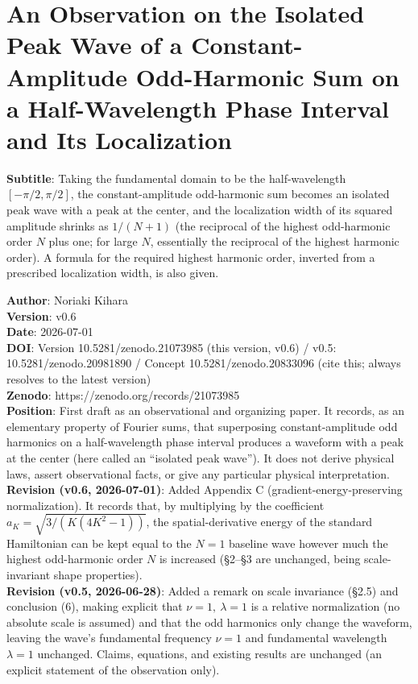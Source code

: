 \documentclass[
]{ltjsarticle}
\author{}
\date{}
\begin{document}
\section{An Observation on the Isolated Peak Wave of a
Constant-Amplitude Odd-Harmonic Sum on a Half-Wavelength Phase Interval
and Its
Localization}\label{an-observation-on-the-isolated-peak-wave-of-a-constant-amplitude-odd-harmonic-sum-on-a-half-wavelength-phase-interval-and-its-localization}

\textbf{Subtitle}: Taking the fundamental domain to be the
half-wavelength \([-\pi/2,\pi/2]\), the constant-amplitude odd-harmonic
sum becomes an isolated peak wave with a peak at the center, and the
localization width of its squared amplitude shrinks as \(1/(N+1)\) (the
reciprocal of the highest odd-harmonic order \(N\) plus one; for large
\(N\), essentially the reciprocal of the highest harmonic order). A
formula for the required highest harmonic order, inverted from a
prescribed localization width, is also given.

\textbf{Author}: Noriaki Kihara\\
\textbf{Version}: v0.6\\
\textbf{Date}: 2026-07-01\\
\textbf{DOI}: Version 10.5281/zenodo.21073985 (this version, v0.6) /
v0.5: 10.5281/zenodo.20981890 / Concept 10.5281/zenodo.20833096 (cite
this; always resolves to the latest version)\\
\textbf{Zenodo}: https://zenodo.org/records/21073985\\
\textbf{Position}: First draft as an observational and organizing paper.
It records, as an elementary property of Fourier sums, that superposing
constant-amplitude odd harmonics on a half-wavelength phase interval
produces a waveform with a peak at the center (here called an ``isolated
peak wave''). It does not derive physical laws, assert observational
facts, or give any particular physical interpretation.\\
\textbf{Revision (v0.6, 2026-07-01)}: Added Appendix C
(gradient-energy-preserving normalization). It records that, by
multiplying by the coefficient \(a_K=\sqrt{3/(K(4K^2-1))}\), the
spatial-derivative energy of the standard Hamiltonian can be kept equal
to the \(N=1\) baseline wave however much the highest odd-harmonic order
\(N\) is increased (§2--§3 are unchanged, being scale-invariant shape
properties).\\
\textbf{Revision (v0.5, 2026-06-28)}: Added a remark on scale invariance
(§2.5) and conclusion (6), making explicit that \(\nu=1,\ \lambda=1\) is
a relative normalization (no absolute scale is assumed) and that the odd
harmonics only change the waveform, leaving the wave's fundamental
frequency \(\nu=1\) and fundamental wavelength \(\lambda=1\) unchanged.
Claims, equations, and existing results are unchanged (an explicit
statement of the observation only).
\end{document}
